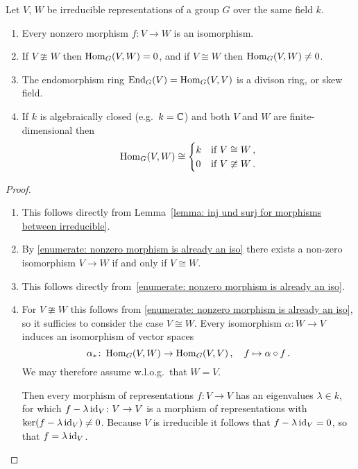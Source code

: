 \begin{corollary}
  Let $V$, $W$ be irreducible representations of a group $G$ over the same field $k$.
  \begin{enumerate}
    \item
      \label{enumerate: nonzero morphism is already an iso}
      Every nonzero morphism $f \colon V \to W$ is an isomorphism.
    \item
      If $V \ncong W$ then $\operatorname{Hom}_G(V,W) = 0$, and if $V \cong W$ then $\operatorname{Hom}_G(V,W) \neq 0$.
    \item
      The endomorphism ring $\operatorname{End}_G(V) = \operatorname{Hom}_G(V,V)$ is a divison ring, or skew field.
    \item
      \label{enumerate: morphism space is one-dimensional}
      If $k$ is algebraically closed (e.g.\ $k = \mathbb{C}$) and both $V$ and $W$ are finite-dimensional then
      \[
              \operatorname{Hom}_G(V,W)
        \cong \begin{cases}
                k & \text{if $V \cong W$}     \,, \\
                0 & \text{if $V \ncong W$} \,.
              \end{cases}
      \]
  \end{enumerate}
\end{corollary}


\begin{proof}
  \leavevmode
  \begin{enumerate}
    \item 
      This follows directly from Lemma~\ref{lemma: inj und surj for morphisms between irreducible}.
    \item
      By \ref{enumerate: nonzero morphism is already an iso} there exists a non-zero isomorphism $V \to W$ if and only if $V \cong W$.
    \item
      This follows directly from~\ref{enumerate: nonzero morphism is already an iso}.
    \item
      For $V \ncong W$ this follows from \ref{enumerate: nonzero morphism is already an iso}, so it sufficies to consider the case $V \cong W$.
      Every isomorphism $\alpha \colon W \to V$ induces an isomorphism of vector spaces
      \[
                \alpha_*
        \colon  \operatorname{Hom}_G(V,W)
        \to     \operatorname{Hom}_G(V,V) \,,
        \quad   f
        \mapsto \alpha \circ f \,.
      \]
      We may therefore assume w.l.o.g.\ that $W = V$.
      
      Then every morphism of representations $f \colon V \to V$ has an eigenvalues $\lambda \in k$, for which $f - \lambda \operatorname{id}_V \colon V \to V$ is a morphism of representations with $\ker(f - \lambda \operatorname{id}_V) \neq 0$.
      Because $V$ is irreducible it follows that $f - \lambda \operatorname{id}_V = 0$, so that $f = \lambda \operatorname{id}_V$.
  \qedhere
  \end{enumerate}
\end{proof}


